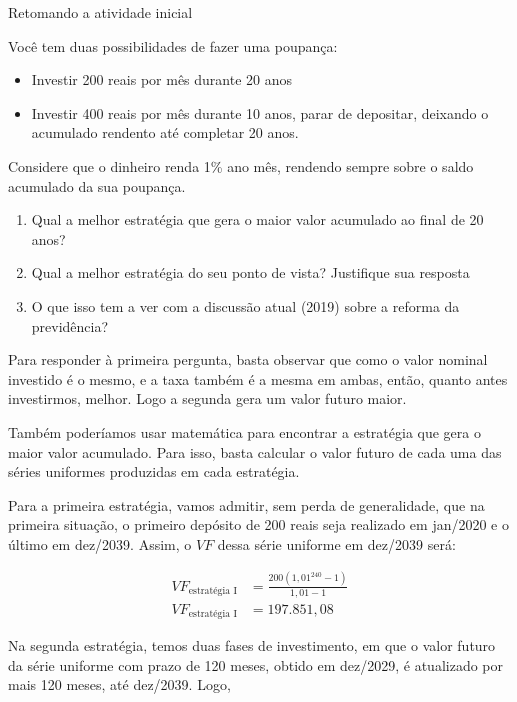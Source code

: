 \begin{example}{Retomando a atividade inicial}
\label{fin-exemp-1}

Você tem duas possibilidades de fazer uma poupança:
\begin{itemize}
\item Investir 200 reais por mês durante 20 anos
\item Investir 400 reais por mês durante 10 anos, parar de depositar, deixando o acumulado rendento até completar 20 anos.

\end{itemize}

Considere que o dinheiro renda 1\% ano mês, rendendo sempre sobre o saldo acumulado da sua poupança.

\begin{enumerate}

\item Qual a melhor estratégia que gera o maior valor acumulado ao final de 20 anos?

\item Qual a melhor estratégia do seu ponto de vista? Justifique sua resposta

\item O que isso tem a ver com a discussão atual (2019) sobre a reforma da previdência?

\end{enumerate}

Para responder à primeira pergunta, basta observar que como o valor nominal investido é o mesmo, e a taxa também é a mesma em ambas, então, quanto antes investirmos, melhor. Logo a segunda gera um valor futuro maior.

Também poderíamos usar matemática para encontrar a estratégia que gera o maior valor acumulado. Para isso, basta calcular o valor futuro de cada uma das séries uniformes produzidas em cada estratégia. 

Para a primeira estratégia, vamos admitir, sem perda de generalidade, que na primeira situação, o primeiro depósito de 200 reais seja realizado em jan/2020 e o último em dez/2039. Assim, o $\mathit{VF}$ dessa série uniforme em dez/2039 será: 


\begin{align*}
\mathit{VF}_{\text{estratégia I}}&=\frac{200(1{,}01^{240}-1)}{1{,}01-1}\\
\mathit{VF}_{\text{estratégia I}}&=197.851{,}08
\end{align*}

Na segunda estratégia, temos duas fases de investimento, em que o valor futuro da série uniforme com prazo de 120 meses, obtido em dez/2029, é atualizado por mais 120 meses, até dez/2039. Logo, 


\end{example}
